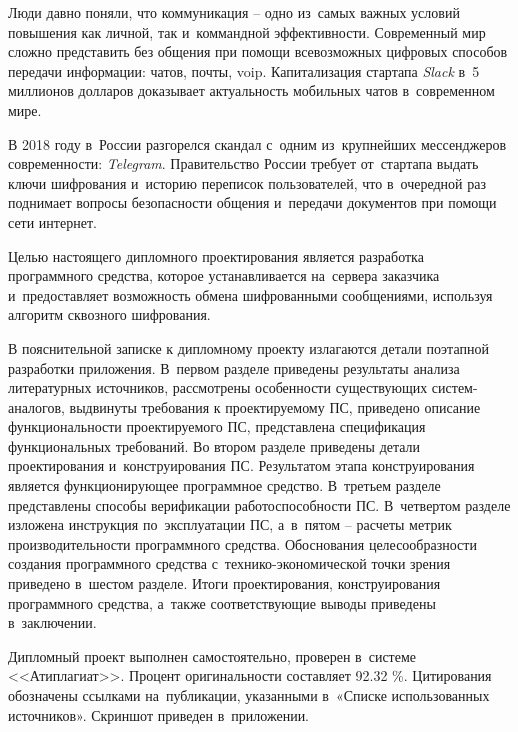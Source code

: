 
Люди давно поняли, что коммуникация -- одно из~самых важных условий повышения как личной, так и~коммандной эффективности. Современный мир сложно представить без общения при помощи всевозможных цифровых способов передачи информации: чатов, почты, \gls{voip}. Капитализация стартапа \textit{Slack} в~5 миллионов долларов\cite{slack:capitalization} доказывает актуальность мобильных чатов в~современном мире.

В 2018 году в~России разгорелся скандал с~одним из~крупнейших мессенджеров современности: \textit{Telegram}. Правительство России требует от~стартапа выдать ключи шифрования и~историю переписок пользователей, что в~очередной раз поднимает вопросы безопасности общения и~передачи документов при помощи сети интернет\cite{telegram:vs:rkn}.

Целью настоящего дипломного проектирования является разработка программного средства, которое устанавливается на~сервера заказчика и~предоставляет возможность обмена шифрованными сообщениями, используя алгоритм сквозного шифрования.

В пояснительной записке к дипломному проекту излагаются детали поэтапной разработки приложения. В~первом разделе приведены результаты анализа литературных источников, рассмотрены особенности существующих систем-аналогов, выдвинуты требования к проектируемому ПС, приведено описание функциональности проектируемого ПС, представлена спецификация функциональных требований. Во втором разделе приведены детали проектирования и~конструирования ПС. Результатом этапа конструирования является функционирующее программное средство. В~третьем разделе представлены способы верификации работоспособности ПС. В~четвертом разделе изложена инструкция по~эксплуатации ПС, а~в~пятом -- расчеты метрик производительности программного средства. Обоснования целесообразности создания программного средства с~технико-экономической точки зрения приведено в~шестом разделе. Итоги проектирования, конструирования программного средства, а~также соответствующие выводы приведены в~заключении.

Дипломный проект выполнен самостоятельно, проверен в~системе <<Атиплагиат>>. Процент оригинальности составляет \num{92.32} \%. Цитирования обозначены ссылками на~публикации, указанными в~«Списке использованных источников».
Скриншот приведен в~приложении.